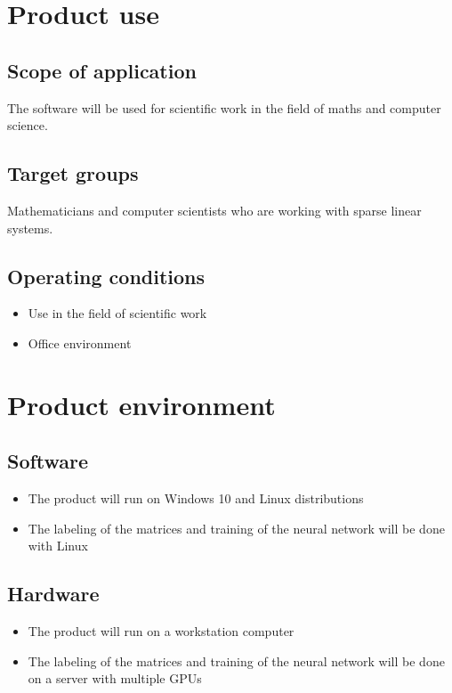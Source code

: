 \documentclass[parskip=full]{scrartcl}
\begin{document}
\section{Product use}
\subsection{Scope of application}
The software will be used for scientific work in the field of maths and computer science.
\subsection{Target groups}
Mathematicians and computer scientists who are working with sparse linear systems.
\subsection{Operating conditions}

\begin{itemize}
\item Use in the field of scientific work
\item Office environment
\end{itemize}

\section{Product environment}


\subsection{Software}
\begin{itemize}
\item The product will run on \gls{Windows} 10 and \gls{Linux} distributions 
\item The labeling of the matrices and training of the \gls{neural network} will be done with \gls{Linux}
\end{itemize}
\subsection{Hardware}

\begin{itemize}
\item The product will run on a workstation computer
\item The labeling of the matrices and training of the \gls{neural network} will be done on a server with multiple \glspl{GPU}
\end{itemize}
\end{document}
